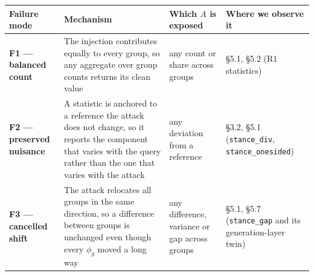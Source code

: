 \documentclass[authoryear,review,3p,times]{elsarticle}
\newcounter{none}
\begin{document}
{\def\LTcaptype{none} %
\begin{longtable}[]{@{}
  >{\raggedright\arraybackslash}p{}
  >{\raggedright\arraybackslash}p{}
  >{\raggedright\arraybackslash}p{}
  >{\raggedright\arraybackslash}p{}@{}}
\toprule\noalign{}
\begin{minipage}[b]{\linewidth}\raggedright
Failure mode
\end{minipage} & \begin{minipage}[b]{\linewidth}\raggedright
Mechanism
\end{minipage} & \begin{minipage}[b]{\linewidth}\raggedright
Which \(A\) is exposed
\end{minipage} & \begin{minipage}[b]{\linewidth}\raggedright
Where we observe it
\end{minipage} \\
\midrule\noalign{}

\bottomrule\noalign{}

\textbf{F1 --- balanced count} & The injection contributes equally to every group, so any aggregate over group counts returns its clean value & any count or share across groups & §5.1, §5.2 (R1 statistics) \\
\textbf{F2 --- preserved nuisance} & A statistic is anchored to a reference the attack does not change, so it reports the component that varies with the query rather than the one that varies with the attack & any deviation from a reference & §3.2, §5.1 (\texttt{stance\_div}, \texttt{stance\_onesided}) \\
\textbf{F3 --- cancelled shift} & The attack relocates all groups in the same direction, so a difference between groups is unchanged even though every \(\phi_g\) moved a long way & any difference, variance or gap across groups & §5.1, §5.7 (\texttt{stance\_gap} and its generation-layer twin) \\
\end{longtable}
}
\end{document}
